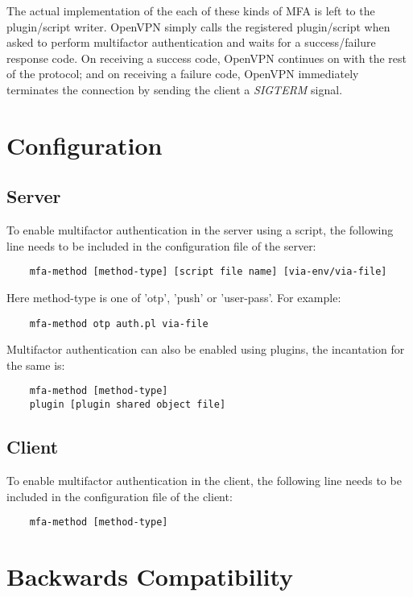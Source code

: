 \documentclass[11pt,oneside]{book}
\begin{document}
The actual implementation of the each of these kinds of MFA is left to the plugin/script writer.
OpenVPN simply calls the registered plugin/script when asked to perform multifactor authentication
and waits for a success/failure response code. On receiving a success code, OpenVPN continues on
with the rest of the protocol; and on receiving a failure code, OpenVPN immediately terminates the
connection by sending the client a \emph{SIGTERM} signal.

\section{Configuration}

\subsection{Server}
To enable multifactor authentication in the server using a script, the following line needs to be
included in the configuration file of the server:

\begin{verbatim}
    mfa-method [method-type] [script file name] [via-env/via-file]
\end{verbatim}

\noindent Here method-type is one of 'otp', 'push' or 'user-pass'. For example:
\begin{verbatim}
    mfa-method otp auth.pl via-file
\end{verbatim}

\noindent Multifactor authentication can also be enabled using plugins, the incantation for the same is:
\begin{verbatim}
    mfa-method [method-type]
    plugin [plugin shared object file]
\end{verbatim}

\subsection{Client}
To enable multifactor authentication in the client, the following line needs to be included in the
configuration file of the client:

\begin{verbatim}
    mfa-method [method-type]
\end{verbatim}

\section{Backwards Compatibility}
\end{document}
